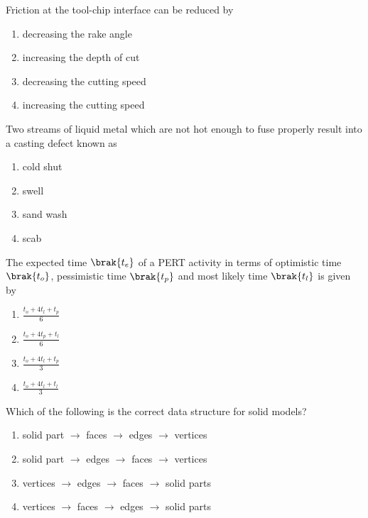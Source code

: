 \item Friction at the tool-chip interface can be reduced by
\begin{multicols}{2}
\begin{enumerate}
    \item decreasing the rake angle
    \item increasing the depth of cut
    \item decreasing the cutting speed
    \item increasing the cutting speed
\end{enumerate}
\end{multicols}

\item Two streams of liquid metal which are not hot enough to fuse properly
result into a casting defect known as
\begin{multicols}{4}
\begin{enumerate}
    \item cold shut
    \item swell
    \item sand wash
    \item scab
\end{enumerate}
\end{multicols}

\item The expected time $\brak{t_e}$ of a PERT activity in terms of optimistic time
$\brak{t_o}$, pessimistic time $\brak{t_p}$ and most likely time $\brak{t_l}$
is given by
\begin{multicols}{2}
\begin{enumerate}
    \item $\frac{t_o + 4t_l + t_p}{6}$
    \item $\frac{t_o + 4t_p + t_l}{6}$
    \item $\frac{t_o + 4t_l + t_p}{3}$
    \item $\frac{t_o + 4t_l + t_l}{3}$
\end{enumerate}
\end{multicols}

\item Which of the following is the correct data structure for solid models?
\begin{enumerate}
    \item solid part $\rightarrow$ faces $\rightarrow$ edges $\rightarrow$ vertices
    \item solid part $\rightarrow$ edges $\rightarrow$ faces $\rightarrow$ vertices
    \item vertices $\rightarrow$ edges $\rightarrow$ faces $\rightarrow$ solid parts
    \item vertices $\rightarrow$ faces $\rightarrow$ edges $\rightarrow$ solid parts
\end{enumerate}

